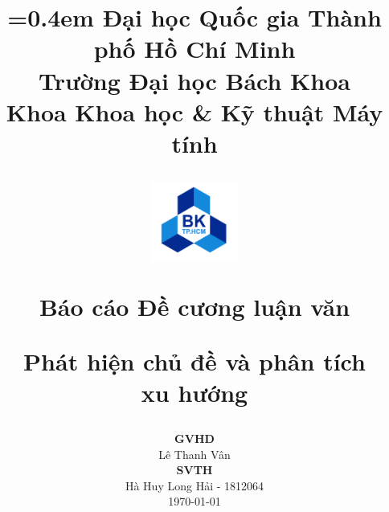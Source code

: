 \title{
	{\parskip=0.4em\normalsize
			Đại học Quốc gia Thành phố Hồ Chí Minh\\
			Trường Đại học Bách Khoa\\
			Khoa Khoa học \& Kỹ thuật Máy tính\\
		}
	\vspace{0.5cm}
	\begin{figure}[!ht]
		\centering
		\includegraphics[width=0.26\textwidth]{img/logo/LogoBKChinhThuc.png}
	\end{figure}
	\vspace{0.1cm}
	{\Large Báo cáo Đề cương luận văn} \\
	\vspace{0.3cm}

	\Huge {\renewcommand{\baselinestretch}{0.1}
		Phát hiện chủ đề và phân tích\\[-0.2em]xu hướng}

	\vspace{0.3cm}
}
\author{}



\date{
	\normalsize
	\textbf{GVHD}\\[0.2em]
	Lê Thanh Vân\\[2em]
	\textbf{SVTH}\\[0.2em]
	Hà Huy Long Hải - 1812064\\
	\vspace{4cm}
	\normalsize{\today}
}

\maketitle
\thispagestyle{empty}
